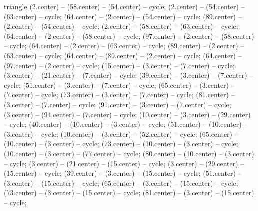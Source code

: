 \begin{pgfonlayer}{triangle}
 (2.center) -- (58.center) -- (54.center) -- cycle; 
 (2.center) -- (54.center) -- (63.center) -- cycle; 
 (64.center) -- (2.center) -- (54.center) -- cycle; 
 (89.center) -- (2.center) -- (54.center) -- cycle; 
 (2.center) -- (58.center) -- (63.center) -- cycle; 
 (64.center) -- (2.center) -- (58.center) -- cycle; 
 (97.center) -- (2.center) -- (58.center) -- cycle; 
 (64.center) -- (2.center) -- (63.center) -- cycle; 
 (89.center) -- (2.center) -- (63.center) -- cycle; 
 (64.center) -- (89.center) -- (2.center) -- cycle; 
 (64.center) -- (97.center) -- (2.center) -- cycle; 
 (15.center) -- (3.center) -- (7.center) -- cycle; 
 (3.center) -- (21.center) -- (7.center) -- cycle; 
 (39.center) -- (3.center) -- (7.center) -- cycle; 
 (51.center) -- (3.center) -- (7.center) -- cycle; 
 (65.center) -- (3.center) -- (7.center) -- cycle; 
 (73.center) -- (3.center) -- (7.center) -- cycle; 
 (81.center) -- (3.center) -- (7.center) -- cycle; 
 (91.center) -- (3.center) -- (7.center) -- cycle; 
 (3.center) -- (94.center) -- (7.center) -- cycle; 
 (10.center) -- (3.center) -- (29.center) -- cycle; 
 (40.center) -- (10.center) -- (3.center) -- cycle; 
 (51.center) -- (10.center) -- (3.center) -- cycle; 
 (10.center) -- (3.center) -- (52.center) -- cycle; 
 (65.center) -- (10.center) -- (3.center) -- cycle; 
 (73.center) -- (10.center) -- (3.center) -- cycle; 
 (10.center) -- (3.center) -- (77.center) -- cycle; 
 (80.center) -- (10.center) -- (3.center) -- cycle; 
 (3.center) -- (21.center) -- (15.center) -- cycle; 
 (3.center) -- (29.center) -- (15.center) -- cycle; 
 (39.center) -- (3.center) -- (15.center) -- cycle; 
 (51.center) -- (3.center) -- (15.center) -- cycle; 
 (65.center) -- (3.center) -- (15.center) -- cycle; 
 (73.center) -- (3.center) -- (15.center) -- cycle; 
 (81.center) -- (3.center) -- (15.center) -- cycle; 

\end{pgfonlayer}
